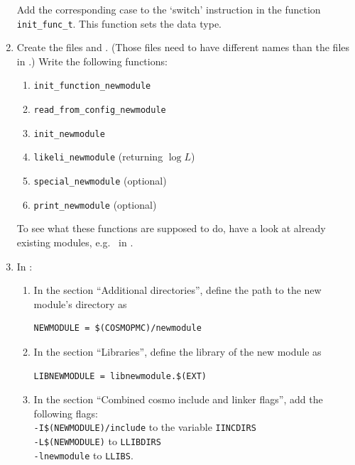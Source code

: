 \documentclass[11pt, chapterprefix, headsepline]{scrartcl}
\begin{document}
\begin{enumerate}
  Add the corresponding case to the `switch' instruction in the function
  \texttt{init\_func\_t}. This function sets the data type.

\item Create the files  and
  . (Those files need to have
  different names than the files in .)
  Write the following functions:

  \begin{enumerate}

  \item  \texttt{init\_function\_newmodule}

  \item \texttt{read\_from\_config\_newmodule}

  \item \texttt{init\_newmodule}

  \item \texttt{likeli\_newmodule} (returning $\log L$)

  \item \texttt{special\_newmodule} (optional)

  \item \texttt{print\_newmodule} (optional)

  \end{enumerate}

  To see what these functions are supposed to do, have a look at
  already existing modules, e.g.~ in .

\item In :

  \begin{enumerate}

  \item In the section ``Additional directories'', define the path to
    the new module's directory as
\begin{verbatim}
NEWMODULE = $(COSMOPMC)/newmodule
\end{verbatim}

  \item In the section ``Libraries'', define the library of the new
    module as
\begin{verbatim}
LIBNEWMODULE = libnewmodule.$(EXT)
\end{verbatim}        

        \item In the section ``Combined cosmo include and linker
          flags'', add the following flags:\\
          \texttt{-I\$(NEWMODULE)/include} to the variable \texttt{IINCDIRS}\\
          \texttt{-L\$(NEWMODULE)} to \texttt{LLIBDIRS}\\
          \texttt{-lnewmodule} to \texttt{LLIBS}.


\end{enumerate}
\end{enumerate}
\end{document}
